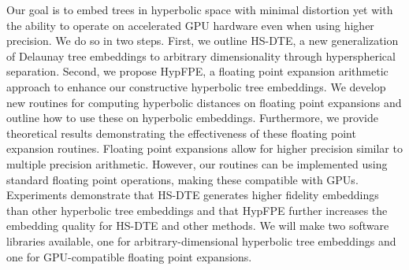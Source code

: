 Our goal is to embed trees in hyperbolic space with minimal distortion yet with the ability to operate on accelerated GPU hardware even when using higher precision. We do so in two steps. First, we outline HS-DTE, a new generalization of Delaunay tree embeddings \citep{sarkar2011low} to arbitrary dimensionality through hyperspherical separation. Second, we propose HypFPE, a floating point expansion arithmetic approach to enhance our constructive hyperbolic tree embeddings. We develop new routines for computing hyperbolic distances on floating point expansions and outline how to use these on hyperbolic embeddings. Furthermore, we provide theoretical results demonstrating the effectiveness of these floating point expansion routines. Floating point expansions allow for higher precision similar to multiple precision arithmetic. However, our routines can be implemented using standard floating point operations, making these compatible with GPUs. Experiments demonstrate that HS-DTE generates higher fidelity embeddings than other hyperbolic tree embeddings and that HypFPE further increases the embedding quality for HS-DTE and other methods. We will make two software libraries available, one for arbitrary-dimensional hyperbolic tree embeddings and one for GPU-compatible floating point expansions.






